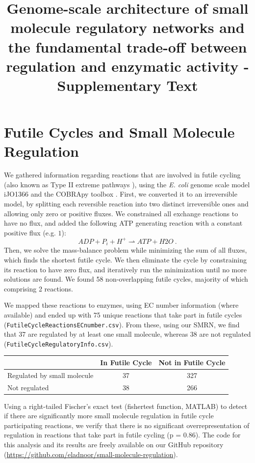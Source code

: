 \documentclass[12pt,a4paper]{article}
\title{Genome-scale architecture of small molecule regulatory networks and the fundamental trade-off between regulation and enzymatic activity - Supplementary Text}
\begin{document}
\maketitle
\tableofcontents
\pagebreak
\section{Futile Cycles and Small Molecule Regulation}
We gathered information regarding reactions that are involved in futile cycling (also known as Type II extreme pathways \cite{Price2002-ef}), using the \emph{E. coli} genome scale model iJO1366 \cite{Orth2011-qi} and the COBRApy toolbox \cite{Ebrahim2013-vw}. First, we converted it to an irreversible model, by splitting each reversible reaction into two distinct irreversible ones and allowing only zero or positive fluxes. We constrained all exchange reactions to have no flux, and added the following ATP generating reaction with a constant positive flux (e.g. $1$):
\begin{equation}
ADP + P_i + H^+ \rightharpoonup ATP + H2O~.
\end{equation}
Then, we solve the mass-balance problem while minimizing the sum of all fluxes, which finds the shortest futile cycle. We then eliminate the cycle by constraining its reaction to have zero flux, and iteratively run the minimization until no more solutions are found. We found 58 non-overlapping futile cycles, majority of which comprising 2 reactions.

We mapped these reactions to enzymes, using EC number information (where available) and ended up with 75 unique reactions that take part in futile cycles (\texttt{FutileCycleReactionsECnumber.csv}). From these, using our SMRN, we find that 37 are regulated by at least one small molecule, whereas 38 are not regulated (\texttt{FutileCycleRegulatoryInfo.csv}).

\begin{center}
\begin{tabular}{|l|c|c|}
	\hline
    & In Futile Cycle & Not in Futile Cycle  \\ \hline
Regulated by small molecule & 37 & 327  \\ \hline
Not regulated & 38 & 266 \\ \hline
\end{tabular}
\end{center}

Using a right-tailed Fischer’s exact test (fishertest function, MATLAB) to detect if there are significantly more small molecule regulation in futile cycle participating reactions, we verify that there is no significant overrepresentation of regulation in reactions that take part in futile cycling (p = 0.86).
The code for this analysis and its results are freely available on our GitHub repository (\url{https://github.com/eladnoor/small-molecule-regulation}).
\end{document}

